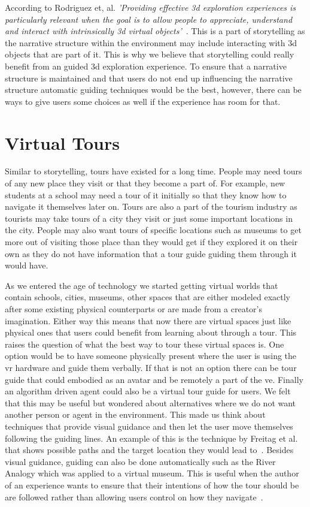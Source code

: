 According to Rodriguez et, al. \textit{'Providing effective \acrshort{3d} exploration	experiences is particularly relevant when the goal is to allow people to appreciate, understand and interact with intrinsically \acrshort{3d} virtual objects'}~\cite{Rodriguez2015}. This is a part of storytelling as the narrative structure within the environment may include interacting with \acrshort{3d} objects that are part of it. This is why we believe that storytelling could really benefit from an guided \acrshort{3d} exploration experience. To ensure that a narrative structure is maintained and that users do not end up influencing the narrative structure automatic guiding techniques would be the best, however, there can be ways to give users some choices as well if the experience has room for that. 

\section{Virtual Tours}
\label{section:GJM Virtual Tours}
Similar to storytelling, tours have existed for a long time. People may need tours of any new place they visit or that they become a part of. For example, new students at a school may need a tour of it initially so that they know how to navigate it themselves later on. Tours are also a part of the tourism industry as tourists may take tours of a city they visit or just some important locations in the city. People may also want tours of specific locations such as museums to get more out of visiting those place than they would get if they explored it on their own as they do not have information that a tour guide guiding them through it would have. 

As we entered the age of technology we started getting virtual worlds that contain schools, cities, museums, other spaces that are either modeled exactly after some existing physical counterparts or are made from a creator's imagination. Either way this means that now there are virtual spaces just like physical ones that users could benefit from learning about through a tour. This raises the question of what the best way to tour these virtual spaces is. One option would be to have someone physically present where the user is using the \acrshort{vr} hardware and guide them verbally. If that is not an option there can be tour guide that could embodied as an avatar and be remotely a part of the \acrshort{ve}. Finally an algorithm driven agent could also be a virtual tour guide for users. We felt that this may be useful but wondered about alternatives where we do not want another person or agent in the environment. This made us think about techniques that provide visual guidance and then let the user move themselves following the guiding lines. An example of this is the technique by Freitag et al. that shows possible paths and the target location they would lead to~\cite{Freitag2018}. Besides visual guidance, guiding can also be done automatically such as the River Analogy which was applied to a virtual museum. This is useful when the author of an experience wants to ensure that their intentions of how the tour should be are followed rather than allowing users control on how they navigate~\cite{Galyean1995}.

